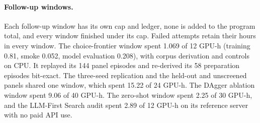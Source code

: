 \paragraph{Follow-up windows.}
Each follow-up window has its own cap and ledger, none is added to the program total, and every window finished under its cap. Failed attempts retain their hours in every window. The choice-frontier window spent 1.069 of 12 GPU-h (training 0.81, smoke 0.052, model evaluation 0.208), with corpus derivation and controls on CPU. It replayed its 144 panel episodes and re-derived its 58 preparation episodes bit-exact. The three-seed replication and the held-out and unscreened panels shared one window, which spent 15.22 of 24 GPU-h. The DAgger ablation window spent 9.06 of 40 GPU-h. The zero-shot window spent 2.25 of 30 GPU-h, and the LLM-First Search audit spent 2.89 of 12 GPU-h on its reference server with no paid API use.


